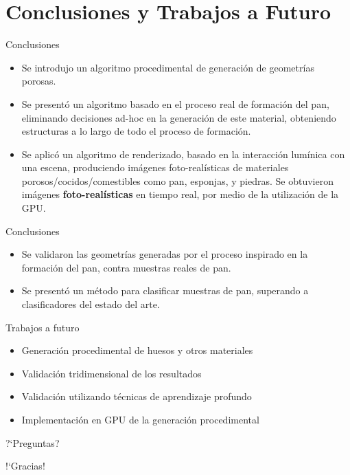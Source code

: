 \documentclass[spanish]{beamer}
\begin{document}
\section{Conclusiones y Trabajos a Futuro}

\begin{frame}{Conclusiones}
\begin{block}{}
\begin{itemize}
\item Se introdujo un algoritmo procedimental de generación de geometrías porosas.
\item Se presentó un algoritmo basado en el proceso real de formación del pan, eliminando decisiones ad-hoc en la generación de este material, obteniendo estructuras a lo largo de todo el proceso de formación.
\item Se aplicó un algoritmo de renderizado, basado en la interacción lumínica con una escena, produciendo imágenes foto-realísticas de materiales porosos/cocidos/comestibles como pan, esponjas, y piedras. Se obtuvieron imágenes \textbf{foto-realísticas} en tiempo real, por medio de la utilización de la GPU.
\end{itemize}
\end{block}
\end{frame}

\begin{frame}{Conclusiones}
\begin{block}{}
\begin{itemize}
\item Se validaron las geometrías generadas por el proceso inspirado en la formación del pan, contra muestras reales de pan.
\item Se presentó un método para clasificar muestras de pan, superando a clasificadores del estado del arte.
\end{itemize}
\end{block}
\end{frame}

\begin{frame}{Trabajos a futuro}
\begin{block}{}
\begin{itemize}
\item Generación procedimental de huesos y otros materiales
\item Validación tridimensional de los resultados
\item Validación utilizando técnicas de aprendizaje profundo
\item Implementación en GPU de la generación procedimental
\end{itemize}
\end{block}
\end{frame}

\begin{frame}
\centering

?`Preguntas?

\end{frame}

\begin{frame}
\centering

!`Gracias!

\end{frame}
\end{document}
